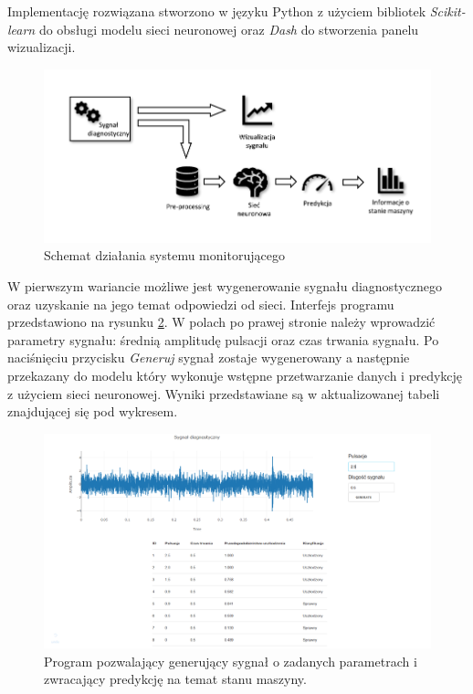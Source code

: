 \documentclass[inzynierska]{pwr_wmat_praca_dyplomowa}
\theoremstyle{plain}
\numberwithin{theorem}{chapter}
\theoremstyle{definition}
\numberwithin{theorem}{chapter}
\begin{document}
Implementację rozwiązana stworzono w języku Python z użyciem bibliotek \textit{Scikit-learn} do obsługi modelu sieci neuronowej oraz \textit{Dash} do stworzenia panelu wizualizacji. 
\begin{figure}[H]
	\centering
	\includegraphics[scale=1.2]{images/monitor_c.pdf}
	\caption{Schemat działania systemu monitorującego}
	\label{monitor}
\end{figure}

W pierwszym wariancie możliwe jest wygenerowanie sygnału diagnostycznego oraz uzyskanie na jego temat odpowiedzi od sieci. Interfejs programu przedstawiono na rysunku \ref{monitor_static}. W polach po prawej stronie należy wprowadzić parametry sygnału: średnią amplitudę pulsacji oraz czas trwania sygnału. Po naciśnięciu przycisku \textit{Generuj} sygnał zostaje wygenerowany a następnie przekazany do modelu który wykonuje wstępne przetwarzanie danych i predykcję z użyciem sieci neuronowej. Wyniki przedstawiane są w aktualizowanej tabeli znajdującej się pod wykresem.
\begin{figure}[H]
	\centering
	\includegraphics[scale=0.4]{images/monitor_static2.png}
	\caption{Program pozwalający generujący sygnał o zadanych parametrach i zwracający predykcję na temat stanu maszyny.}
	\label{monitor_static}
\end{figure}
\end{document}
